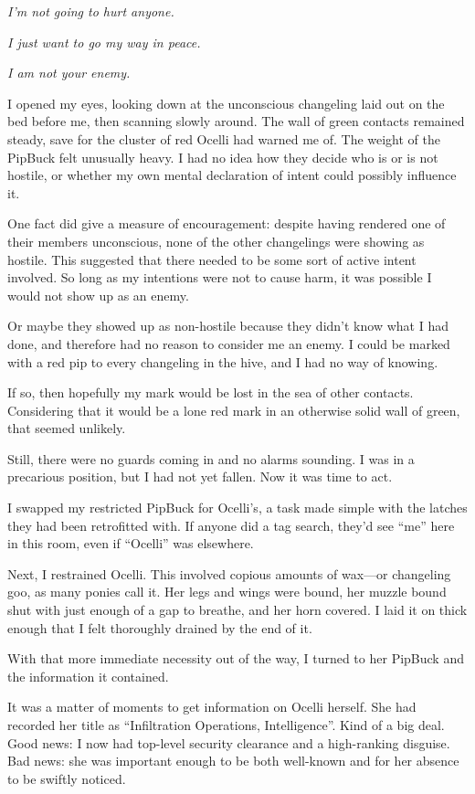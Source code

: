 \textit{I’m not going to hurt anyone.}

\textit{I just want to go my way in peace.}

\textit{I am not your enemy.}

I opened my eyes, looking down at the unconscious changeling laid out on the bed before me, then scanning slowly around. The wall of green contacts remained steady, save for the cluster of red Ocelli had warned me of. The weight of the PipBuck felt unusually heavy. I had no idea how they decide who is or is not hostile, or whether my own mental declaration of intent could possibly influence it.

One fact did give a measure of encouragement: despite having rendered one of their members unconscious, none of the other changelings were showing as hostile. This suggested that there needed to be some sort of active intent involved. So long as my intentions were not to cause harm, it was possible I would not show up as an enemy.

Or maybe they showed up as non-hostile because they didn’t know what I had done, and therefore had no reason to consider me an enemy. I could be marked with a red pip to every changeling in the hive, and I had no way of knowing.

If so, then hopefully my mark would be lost in the sea of other contacts. Considering that it would be a lone red mark in an otherwise solid wall of green, that seemed unlikely.

Still, there were no guards coming in and no alarms sounding. I was in a precarious position, but I had not yet fallen. Now it was time to act.

I swapped my restricted PipBuck for Ocelli’s, a task made simple with the latches they had been retrofitted with. If anyone did a tag search, they’d see “me” here in this room, even if “Ocelli” was elsewhere.

Next, I restrained Ocelli. This involved copious amounts of wax—or changeling goo, as many ponies call it. Her legs and wings were bound, her muzzle bound shut with just enough of a gap to breathe, and her horn covered. I laid it on thick enough that I felt thoroughly drained by the end of it.

With that more immediate necessity out of the way, I turned to her PipBuck and the information it contained.

It was a matter of moments to get information on Ocelli herself. She had recorded her title as “Infiltration Operations, Intelligence”. Kind of a big deal. Good news: I now had top-level security clearance and a high-ranking disguise. Bad news: she was important enough to be both well-known and for her absence to be swiftly noticed.

